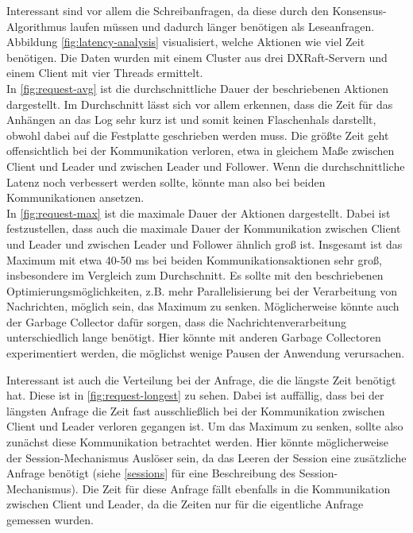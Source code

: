 Interessant sind vor allem die Schreibanfragen, da diese durch den Konsensus-Algorithmus laufen müssen und dadurch länger benötigen als Leseanfragen. Abbildung \ref{fig:latency-analysis} visualisiert, welche Aktionen wie viel Zeit benötigen. Die Daten wurden mit einem Cluster aus drei DXRaft-Servern und einem Client mit vier Threads ermittelt. \\

In \ref{fig:request-avg} ist die durchschnittliche Dauer der beschriebenen Aktionen dargestellt. Im Durchschnitt lässt sich vor allem erkennen, dass die Zeit für das Anhängen an das Log sehr kurz ist und somit keinen Flaschenhals darstellt, obwohl dabei auf die Festplatte geschrieben werden muss. Die größte Zeit geht offensichtlich bei der Kommunikation verloren, etwa in gleichem Maße zwischen Client und Leader und zwischen Leader und Follower. Wenn die durchschnittliche Latenz noch verbessert werden sollte, könnte man also bei beiden Kommunikationen ansetzen. \\

In \ref{fig:request-max} ist die maximale Dauer der Aktionen dargestellt. Dabei ist festzustellen, dass auch die maximale Dauer der Kommunikation zwischen Client und Leader und zwischen Leader und Follower ähnlich groß ist. Insgesamt ist das Maximum mit etwa 40-50 ms bei beiden Kommunikationsaktionen sehr groß, insbesondere im Vergleich zum Durchschnitt. Es sollte mit den beschriebenen Optimierungsmöglichkeiten, z.B. mehr Parallelisierung bei der Verarbeitung von Nachrichten, möglich sein, das Maximum zu senken. Möglicherweise könnte auch der Garbage Collector dafür sorgen, dass die Nachrichtenverarbeitung unterschiedlich lange benötigt. Hier könnte mit anderen Garbage Collectoren experimentiert werden, die möglichst wenige Pausen der Anwendung verursachen.

Interessant ist auch die Verteilung bei der Anfrage, die die längste Zeit benötigt hat. Diese ist in \ref{fig:request-longest} zu sehen. Dabei ist auffällig, dass bei der längsten Anfrage die Zeit fast ausschließlich bei der Kommunikation zwischen Client und Leader verloren gegangen ist. Um das Maximum zu senken, sollte also zunächst diese Kommunikation betrachtet werden. Hier könnte möglicherweise der Session-Mechanismus Auslöser sein, da das Leeren der Session eine zusätzliche Anfrage benötigt (siehe \ref{sessions} für eine Beschreibung des Session-Mechanismus). Die Zeit für diese Anfrage fällt ebenfalls in die Kommunikation zwischen Client und Leader, da die Zeiten nur für die eigentliche Anfrage gemessen wurden.

